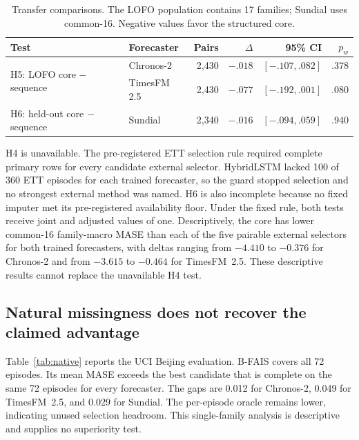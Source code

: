 \documentclass{article}
\newcommand{\bfais}{\textsc{B-FAIS}\xspace}
\begin{document}
\begin{table}[t]
\caption{Transfer comparisons. The LOFO population contains 17 families; Sundial uses common-16. Negative values favor the structured core.}
\label{tab:transfer}
\centering
\small
\setlength{\tabcolsep}{4.2pt}
\begin{tabular}{llrrrr}
\toprule
Test & Forecaster & Pairs & $\Delta$ & 95\% CI & $p_w$ \\
\midrule
\multirow{2}{*}{H5: LOFO core $-$ sequence} & Chronos-2 & 2,430 & $-.018$ & $[-.107,.082]$ & .378 \\
 & TimesFM 2.5 & 2,430 & $-.077$ & $[-.192,.001]$ & .080 \\
H6: held-out core $-$ sequence & Sundial & 2,340 & $-.016$ & $[-.094,.059]$ & .940 \\
\bottomrule
\end{tabular}
\end{table}

H4 is unavailable. The pre-registered ETT selection rule required complete primary rows for every candidate external selector. HybridLSTM lacked 100 of 360 ETT episodes for each trained forecaster, so the guard stopped selection and no strongest external method was named. H6 is also incomplete because no fixed imputer met its pre-registered availability floor. Under the fixed rule, both tests receive joint and adjusted values of one. Descriptively, the core has lower common-16 family-macro MASE than each of the five pairable external selectors for both trained forecasters, with deltas ranging from $-4.410$ to $-0.376$ for Chronos-2 and from $-3.615$ to $-0.464$ for TimesFM~2.5. These descriptive results cannot replace the unavailable H4 test.

\subsection{Natural missingness does not recover the claimed advantage}

Table~\ref{tab:native} reports the UCI Beijing evaluation. \bfais covers all 72 episodes. Its mean MASE exceeds the best candidate that is complete on the same 72 episodes for every forecaster. The gaps are 0.012 for Chronos-2, 0.049 for TimesFM~2.5, and 0.029 for Sundial. The per-episode oracle remains lower, indicating unused selection headroom. This single-family analysis is descriptive and supplies no superiority test.
\end{document}
